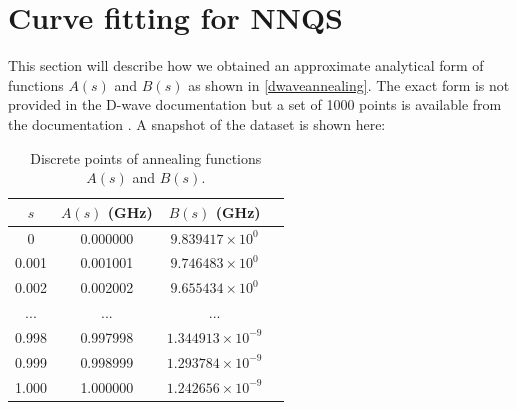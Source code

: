 \chapter{Curve fitting for NNQS}\label{appendix:curvefitting}
This section will describe how we obtained an approximate analytical form of functions $A(s)$ and $B(s)$ as shown in \autoref{dwaveannealing}. The exact form is not provided in the D-wave documentation but a set of 1000 points is available from the documentation \cite{dwavefunctions}. A snapshot of the dataset is shown here:
\begin{table}[!h]
    \centering
    \begin{tabular}{cccc}
    \hline
    $s$ & $A(s)$ (GHz) & $B(s)$ (GHz)\\
    \hline
    0 & 0.000000 & $9.839417 \times 10^0$ \\
    0.001 & 0.001001 & $9.746483 \times 10^0$ \\
    0.002 & 0.002002 & $9.655434 \times 10^0$ \\
    ... & ... & ... \\
    0.998 & 0.997998 & $1.344913 \times 10^{-9}$\\
    0.999 & 0.998999 & $1.293784 \times 10^{-9}$\\
    1.000 & 1.000000 & $1.242656 \times 10^{-9}$\\
    \hline
    \end{tabular}
    \caption{Discrete points of annealing functions $A(s)$ and $B(s)$.}
    \label{tab:dwavefunction}
\end{table}

